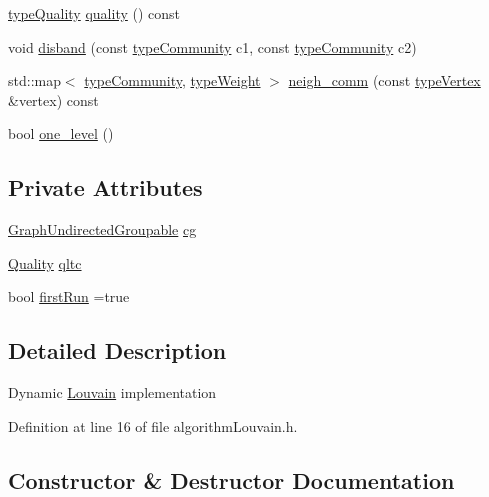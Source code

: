 \begin{DoxyCompactItemize}
\item 
\hyperlink{qualityInterface_8h_a15a3ec6041e6e02d00d2eff22c20fd94}{type\+Quality} \hyperlink{classLouvain_ae328a55f83e485adb14a501bfb704d75}{quality} () const
\item 
void \hyperlink{classLouvain_a0f6163e6efef09a9c1efd8b9b17f5880}{disband} (const \hyperlink{graphUndirectedGroupable_8h_a914da95c9ea7f14f4b7f875c36818556}{type\+Community} c1, const \hyperlink{graphUndirectedGroupable_8h_a914da95c9ea7f14f4b7f875c36818556}{type\+Community} c2)
\item 
std\+::map$<$ \hyperlink{graphUndirectedGroupable_8h_a914da95c9ea7f14f4b7f875c36818556}{type\+Community}, \hyperlink{edge_8h_a2e7ea3be891ac8b52f749ec73fee6dd2}{type\+Weight} $>$ \hyperlink{classLouvain_a22ad57b173ccd1b628d96391811a4265}{neigh\+\_\+comm} (const \hyperlink{edge_8h_a5fbd20c46956d479cb10afc9855223f6}{type\+Vertex} \&vertex) const
\item 
bool \hyperlink{classLouvain_a89a2206f2669b9c0998d23e87ec40fb8}{one\+\_\+level} ()
\end{DoxyCompactItemize}
\subsection*{Private Attributes}
\begin{DoxyCompactItemize}
\item 
\hyperlink{classGraphUndirectedGroupable}{Graph\+Undirected\+Groupable} \hyperlink{classLouvain_ad3b0b06892d045c7fa248c0c968f0276}{cg}
\item 
\hyperlink{classQuality}{Quality} \hyperlink{classLouvain_a8908ca314976918362417a3a8bf45014}{qltc}
\item 
bool \hyperlink{classLouvain_a9b5827ca542b67330c44a971b02d7700}{first\+Run} =true
\end{DoxyCompactItemize}


\subsection{Detailed Description}
Dynamic \hyperlink{classLouvain}{Louvain} implementation 

Definition at line 16 of file algorithm\+Louvain.\+h.



\subsection{Constructor \& Destructor Documentation}
\mbox{\label{classLouvain_a89f2b30815253babdc862aa0d8c4f892}} 
